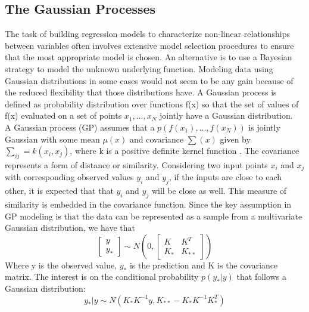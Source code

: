 \documentclass[a4paper]{article}
\begin{document}
\subsection{The Gaussian Processes}
The task of building regression models to characterize non-linear relationships between variables often involves extensive model selection procedures to ensure that the most appropriate model is chosen.
An alternative is to use a Bayesian strategy to model the unknown underlying function.
Modeling data using Gaussian distributions in some cases would not seem to be any gain because of the reduced flexibility that those distributions have. 
A Gaussian process is defined as probability distribution over functions f(x) so that the set of values of f(x) evaluated on a set of points ${ x }_{ 1 },...,{ x }_{ N }$ jointly have a Gaussian distribution.
\\A Gaussian process (GP) assumes that a $p(f({ x }_{ 1 }),...,f({ x }_{ N }))$ is jointly Gaussian with some mean $\mu(x)$ and covariance $ \sum { (x) } $ given by $\sum _{ ij }^{  }{ =k({ x }_{ i },{ x }_{ j }) } $, where k is a positive definite kernel function \cite{gp_process}.
The covariance represents a form of distance or similarity. Considering two input points ${x}_{i}$ and ${x}_{j}$ with corresponding observed values ${y}_{i}$ and ${y}_{j}$, if the inputs are close to each other, it is expected that that ${y}_{i}$ and ${y}_{j}$ will be close as well. This measure of similarity is embedded in the covariance function.
Since the key assumption in GP modeling is that the data can be represented as a sample from a multivariate Gaussian distribution, we have that
\begin{equation}
\begin{bmatrix} y \\ { y }_{ * } \end{bmatrix}\sim N \left( 0,\begin{bmatrix} K & { K }^{ T } \\ { K }_{ * } & { K }_{ ** } \end{bmatrix} \right)
\end{equation}
Where y is the observed value, ${y}_{*}$ is the prediction and K is the covariance matrix. The interest is on the conditional probability $p({y}_{*}|y)$ that follows a Gaussian distribution:
\begin{equation}
{ y }_{ * }|y\sim N({ K }_{ * }{ K }^{ -1 }y,{ K }_{ ** }-{ K }_{ * }{ K }^{ -1 }{ K }_{ * }^{ T })
\end{equation}
\end{document}
